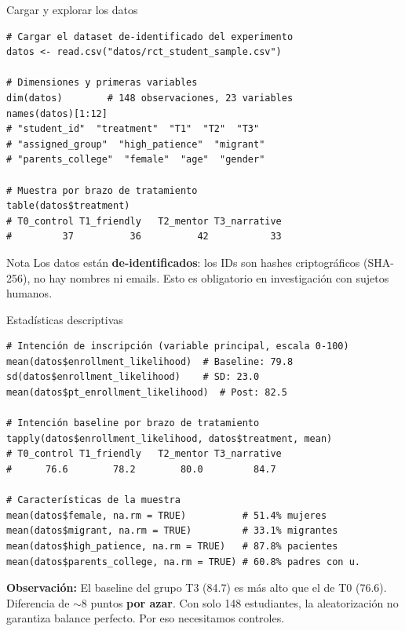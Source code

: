 \documentclass[aspectratio=169, 11pt]{beamer}
\begin{document}
\begin{frame}[fragile]{Cargar y explorar los datos}
\begin{lstlisting}[basicstyle=\ttfamily\scriptsize]
# Cargar el dataset de-identificado del experimento
datos <- read.csv("datos/rct_student_sample.csv")

# Dimensiones y primeras variables
dim(datos)        # 148 observaciones, 23 variables
names(datos)[1:12]
# "student_id"  "treatment"  "T1"  "T2"  "T3"
# "assigned_group"  "high_patience"  "migrant"
# "parents_college"  "female"  "age"  "gender"

# Muestra por brazo de tratamiento
table(datos$treatment)
# T0_control T1_friendly   T2_mentor T3_narrative
#         37          36          42           33
\end{lstlisting}

\vspace{0.1cm}
\begin{alertblock}{Nota}
\small
Los datos están \textbf{de-identificados}: los IDs son hashes criptográficos (SHA-256), no hay nombres ni emails. Esto es obligatorio en investigación con sujetos humanos.
\end{alertblock}
\end{frame}

\begin{frame}[fragile]{Estadísticas descriptivas}
\begin{lstlisting}[basicstyle=\ttfamily\scriptsize]
# Intención de inscripción (variable principal, escala 0-100)
mean(datos$enrollment_likelihood)  # Baseline: 79.8
sd(datos$enrollment_likelihood)    # SD: 23.0
mean(datos$pt_enrollment_likelihood)  # Post: 82.5

# Intención baseline por brazo de tratamiento
tapply(datos$enrollment_likelihood, datos$treatment, mean)
# T0_control T1_friendly   T2_mentor T3_narrative
#      76.6        78.2        80.0         84.7

# Características de la muestra
mean(datos$female, na.rm = TRUE)          # 51.4% mujeres
mean(datos$migrant, na.rm = TRUE)         # 33.1% migrantes
mean(datos$high_patience, na.rm = TRUE)   # 87.8% pacientes
mean(datos$parents_college, na.rm = TRUE) # 60.8% padres con u.
\end{lstlisting}

\vspace{0.1cm}
{\small \textbf{Observación:} El baseline del grupo T3 (84.7) es más alto que el de T0 (76.6). Diferencia de $\sim$8 puntos \textbf{por azar}. Con solo 148 estudiantes, la aleatorización no garantiza balance perfecto. Por eso necesitamos controles.}
\end{frame}
\end{document}

